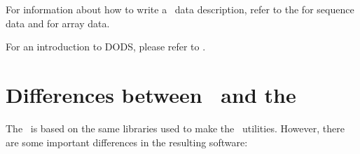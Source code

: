For information about how to write a \ffnd\ data description, refer to
the  for sequence data and
 for array data. 

For an introduction to DODS, please refer to \DODSuser . 






\section{Differences between \ffnd\ and the \ffs}
\label{sec,advanced}

The \ffs\ is based on the same libraries used to make the \ffnd\
utilities.  However, there are some important differences in the
resulting software:

